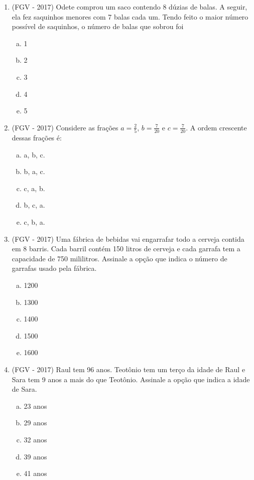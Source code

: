 \begin{enumerate}
 
  \item (FGV - 2017) Odete comprou um saco contendo 8 dúzias de balas. A seguir, ela fez saquinhos menores com 7 balas cada um. Tendo feito o maior número possível de saquinhos, o número de balas que sobrou foi 
  \begin{enumerate}[a)]
  \item 1
  \item 2
  \item 3
  \item 4
  \item 5
  \end{enumerate}
  
  \item (FGV - 2017) Considere as frações $a= \frac{2}{5}$, $b=\frac{7}{20}$ e $c=\frac{7}{20}$. A ordem crescente dessas frações é:
  \begin{enumerate}[a)]
  \item a, b, c.
  \item b, a, c.
  \item c, a, b.
  \item b, c, a.
  \item c, b, a.
  \end{enumerate}
  
  \item (FGV - 2017) Uma fábrica de bebidas vai engarrafar todo a cerveja contida em 8 barris. Cada barril contém 150 litros de cerveja e cada garrafa tem a capacidade de 750 mililitros. Assinale a opção que indica o número de garrafas usado pela fábrica.
  \begin{enumerate}[a)]
  \item 1200
  \item 1300
  \item 1400
  \item 1500
  \item 1600
  \end{enumerate}
  
  \item (FGV - 2017) Raul tem 96 anos. Teotônio tem um terço da idade de Raul e Sara tem 9 anos a mais do que Teotônio. Assinale a opção que indica a idade de Sara.
  \begin{enumerate}[a)]
  \item 23 anos
  \item 29 anos
  \item 32 anos
  \item 39 anos
  \item 41 anos
  \end{enumerate}
  

\end{enumerate}
